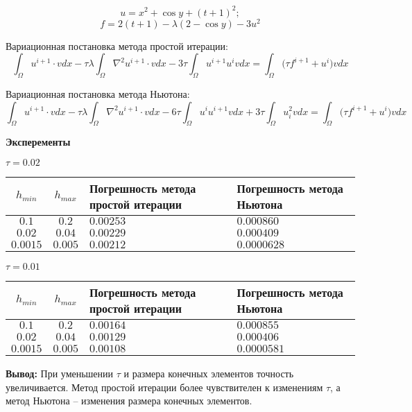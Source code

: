 \documentclass[a4paper, 14pt]{extarticle}
\begin{document}
	\[ u = x^2 + \cos{y} + (t + 1)^2; \]
	\[ f = 2(t + 1) - \lambda (2 - \cos{y}) - 3u^2 \]
	
	Вариационная постановка метода простой итерации: 
	\[ \int_{\Omega} u^{i+1} \cdot vdx - \tau \lambda \int_{\Omega} \nabla^2 u^{i+1} \cdot vdx - 3\tau \int_{\Omega} u^{i+1} u^i v dx = \int_{\Omega} \big(\tau f^{i+1} + u^i\big) v dx \]
	
	Вариационная постановка метода Ньютона:
	\[ \int_{\Omega} u^{i+1} \cdot vdx - \tau \lambda \int_{\Omega} \nabla^2 u^{i+1} \cdot vdx -6\tau \int_{\Omega} u^i u^{i+1} v dx + 3\tau\int_{\Omega}u^2_i vdx = \int_{\Omega} \big(\tau f^{i+1} + u^i\big) v dx \]
	
	\textbf{Эксперементы}
	
	\( \tau = 0.02 \)
	\begin{center}
	\begin{tabular}{|c|c|m{10em}|m{10em}|}
		\hline
			$h_{min}$ & $h_{max}$ & Погрешность метода простой итерации & Погрешность
			метода Ньютона \\
		\hline
		 	$0.1$ & $0.2$ & $0.00253$ & $0.000860$\\
 		\hline
 			$0.02$ & $0.04$ & $0.00229$ & $0.000409$\\
 		\hline
 			$0.0015$ & $0.005$ & $0.00212$ & $0.0000628$\\
 		\hline
	\end{tabular}
	\end{center}

	\( \tau = 0.01 \)
	\begin{center}
		\begin{tabular}{|c|c|m{10em}|m{10em}|}
			\hline
			$h_{min}$ & $h_{max}$ & Погрешность метода простой итерации & Погрешность
			метода Ньютона \\
			\hline
			$0.1$ & $0.2$ & $0.00164$ & $0.000855$\\
			\hline
			$0.02$ & $0.04$ & $0.00129$ & $0.000406$\\
			\hline
			$0.0015$ & $0.005$ & $0.00108$ & $0.0000581$\\
			\hline
		\end{tabular}
	\end{center}

	\textbf{Вывод:} При уменьшении $\tau$ и размера конечных элементов точность увеличивается. Метод простой итерации более чувствителен к изменениям $\tau$, а метод Ньютона -- изменения размера конечных элементов. 
\end{document}
